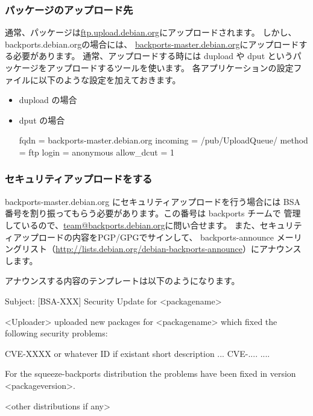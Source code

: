 \documentclass[mingoth,a4paper]{jsarticle}
\begin{document}
\subsubsection{パッケージのアップロード先}
通常、パッケージは\url{ftp.upload.debian.org}にアップロードされます。
しかし、backports.debian.orgの場合には、
\url{backports-master.debian.org}にアップロードする必要があります。
通常、アップロードする時には dupload や dput
というパッケージをアップロードするツールを使います。
各アプリケーションの設定ファイルに以下のような設定を加えておきます。

\begin{itemize}
\item dupload の場合

\item dput の場合
\begin{commandline}
[bpo]
fqdn = backports-master.debian.org
incoming = /pub/UploadQueue/
method = ftp
login = anonymous
allow_dcut = 1
\end{commandline}
\end{itemize}

\subsubsection{セキュリティアップロードをする}
backports-master.debian.org にセキュリティアップロードを行う場合には
BSA 番号を割り振ってもらう必要があります。この番号は backports チームで
管理しているので、\url{team@backports.debian.org}に問い合せます。
また、セキュリティアップロードの内容をPGP/GPGでサインして、
backports-announce メーリングリスト（\url{http://lists.debian.org/debian-backports-announce}）にアナウンスします。

アナウンスする内容のテンプレートは以下のようになります。
\begin{commandline}
Subject: [BSA-XXX] Security Update for <packagename>

<Uploader> uploaded new packages for <packagename> which fixed the
following security problems:

CVE-XXXX or whatever ID if existant
  short description
  ...
CVE-....
  ....

For the squeeze-backports distribution the problems have been fixed in
version <packageversion>.

<other distributions if any>
\end{commandline}
\end{document}
